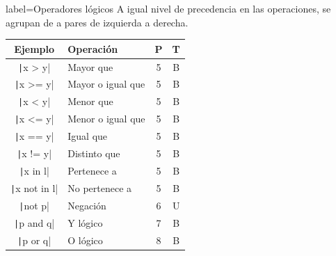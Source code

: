 \begin{contentbox}{label=Operadores lógicos}
    A igual nivel de precedencia en las operaciones, se agrupan de a pares de izquierda a derecha.

    \begin{center}
        \begin{tabular}{C|l|c|c}
            \textnormal{Ejemplo} & Operación & P & T \\
            \hline
            \texttt|x > y| & Mayor que & 5 & B \\
            \texttt|x >= y| & Mayor o igual que & 5 & B \\
            \texttt|x < y| & Menor que & 5 & B \\
            \texttt|x <= y| & Menor o igual que & 5 & B \\
            \texttt|x == y| & Igual que & 5 & B \\
            \texttt|x != y| & Distinto que & 5 & B \\
            \texttt|x in l| & Pertenece a & 5 & B \\
            \texttt|x not in l| & No pertenece a & 5 & B \\
            \hline
            \texttt|not p| & Negación & 6 & U \\
            \texttt|p and q| & Y lógico & 7 & B \\
            \texttt|p or q| & O lógico & 8 & B \\
            \hline
        \end{tabular}
    \end{center}
\end{contentbox}

